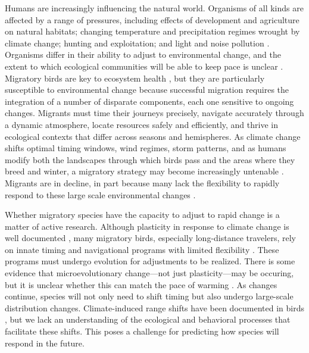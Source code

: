 \documentclass[a4paper, twoside]{templates/ociamthesis}
\begin{document}
Humans are increasingly influencing the natural world. Organisms of all kinds are affected by a range of pressures, including effects of development and agriculture on natural habitats; changing temperature and precipitation regimes wrought by climate change; hunting and exploitation; and light and noise pollution \autocite{gastonEcologicalImpactsNighttime2013,hanskiHabitatLossDynamics2011,mantyka-pringleInteractionsClimateHabitat2012,benitez-lopezImpactHuntingTropical2017,kuncAquaticNoisePollution2016,urbanAcceleratingExtinctionRisk2015}. Organisms differ in their ability to adjust to environmental change, and the extent to which ecological communities will be able to keep pace is unclear \autocite{feeleyAmazonVulnerabilityClimate2012,liangHowDisturbanceCompetition2018,poloczanskaGlobalImprintClimate2013,urbanImprovingForecastBiodiversity2016}. Migratory birds are key to ecosystem health \autocite{bauerMigratoryAnimalsCouple2014}, but they are particularly susceptible to environmental change because successful migration requires the integration of a number of disparate components, each one sensitive to ongoing changes. Migrants must time their journeys precisely, navigate accurately through a dynamic atmosphere, locate resources safely and efficiently, and thrive in ecological contexts that differ across seasons and hemispheres. As climate change shifts optimal timing windows, wind regimes, storm patterns, and as humans modify both the landscapes through which birds pass and the areas where they breed and winter, a migratory strategy may become increasingly untenable \autocite{wilcoveGoingGoingGone2008,rungeProtectedAreasGlobal2015}. Migrants are in decline, in part because many lack the flexibility to rapidly respond to these large scale environmental changes \autocite{beresfordPhenologyClimateChange,bothAvianPopulationConsequences2009,fraserIndividualVariabilityMigration2019,sandersonLongtermPopulationDeclines2006}.

Whether migratory species have the capacity to adjust to rapid change is a matter of active research. Although plasticity in response to climate change is well documented \autocite{gienappResponsesClimateChange2007,usuiTemporalShiftsTemperature2017}, many migratory birds, especially long-distance travelers, rely on innate timing and navigational programs with limited flexibility \autocite{akessonTimingAvianLongdistance2017,gwinnerCircannualClocksAvian1996}. These programs must undergo evolution for adjustments to be realized. There is some evidence that microevolutionary change---not just plasticity---may be occuring, but it is unclear whether this can match the pace of warming \autocite{helmEvolutionaryResponseClimate2019,vanbuskirkPhenotypicPlasticityAlone2012,charmantierClimateChangeTiming2014,merilaClimateChangeAdaptation2014}. As changes continue, species will not only need to shift timing but also undergo large-scale distribution changes. Climate-induced range shifts have been documented in birds \autocite{ambrosiniClimateChangeLongterm2011,lehikoinenNorthNorthwestClimate2016,lasortePolewardShiftsWinter2007,tingleyPushPullClimate2012}, but we lack an understanding of the ecological and behavioral processes that facilitate these shifts. This poses a challenge for predicting how species will respond in the future.
\end{document}
